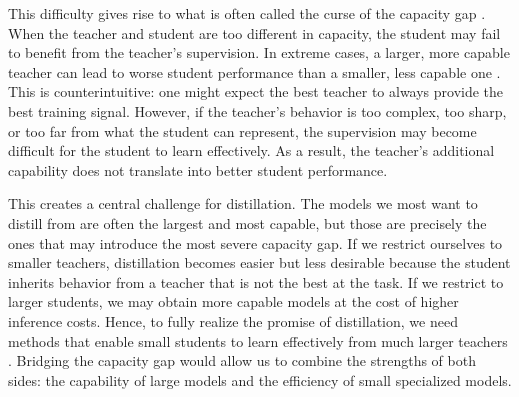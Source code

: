 This difficulty gives rise to what is often called the curse of the capacity gap \citep{zhangLiftingCurseCapacity2023}. When the teacher and student are too different in capacity, the student may fail to benefit from the teacher’s supervision. In extreme cases, a larger, more capable teacher can lead to worse student performance than a smaller, less capable one \citep{mirzadehImprovedKnowledgeDistillation2019, liSmallModelsStruggle2025}. This is counterintuitive: one might expect the best teacher to always provide the best training signal. However, if the teacher’s behavior is too complex, too sharp, or too far from what the student can represent, the supervision may become difficult for the student to learn effectively. As a result, the teacher’s additional capability does not translate into better student performance.

This creates a central challenge for distillation. The models we most want to distill from are often the largest and most capable, but those are precisely the ones that may introduce the most severe capacity gap. If we restrict ourselves to smaller teachers, distillation becomes easier but less desirable because the student inherits behavior from a teacher that is not the best at the task. If we restrict to larger students, we may obtain more capable models at the cost of higher inference costs. Hence, to fully realize the promise of distillation, we need methods that enable small students to learn effectively from much larger teachers \citep{shi2021FollowYourPath, shingTAIDTemporallyAdaptive2025, jang2026StableOnPolicyDistillation}. Bridging the capacity gap would allow us to combine the strengths of both sides: the capability of large models and the efficiency of small specialized models.

